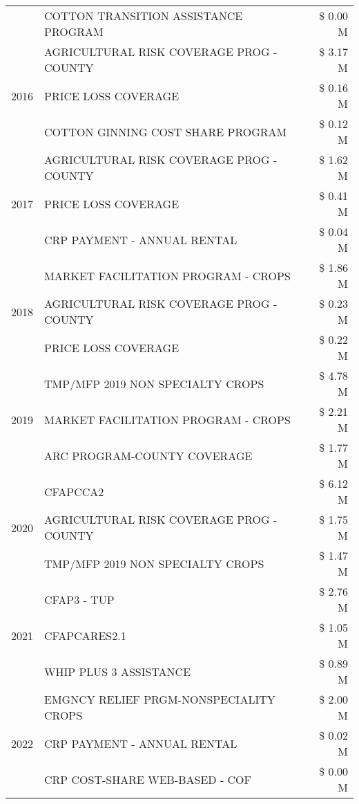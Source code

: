 \begin{tabular}{llr}
 & COTTON TRANSITION ASSISTANCE PROGRAM & \$ 0.00 M \\
\cline{1-3}
\multirow[t]{3}{*}{2016} & AGRICULTURAL RISK COVERAGE PROG - COUNTY & \$ 3.17 M \\
 & PRICE LOSS COVERAGE & \$ 0.16 M \\
 & COTTON GINNING COST SHARE PROGRAM & \$ 0.12 M \\
\cline{1-3}
\multirow[t]{3}{*}{2017} & AGRICULTURAL RISK COVERAGE PROG - COUNTY & \$ 1.62 M \\
 & PRICE LOSS COVERAGE & \$ 0.41 M \\
 & CRP PAYMENT - ANNUAL RENTAL & \$ 0.04 M \\
\cline{1-3}
\multirow[t]{3}{*}{2018} & MARKET FACILITATION PROGRAM - CROPS & \$ 1.86 M \\
 & AGRICULTURAL RISK COVERAGE PROG - COUNTY & \$ 0.23 M \\
 & PRICE LOSS COVERAGE & \$ 0.22 M \\
\cline{1-3}
\multirow[t]{3}{*}{2019} & TMP/MFP 2019 NON SPECIALTY CROPS & \$ 4.78 M \\
 & MARKET FACILITATION PROGRAM - CROPS & \$ 2.21 M \\
 & ARC PROGRAM-COUNTY COVERAGE & \$ 1.77 M \\
\cline{1-3}
\multirow[t]{3}{*}{2020} & CFAPCCA2 & \$ 6.12 M \\
 & AGRICULTURAL RISK COVERAGE PROG - COUNTY & \$ 1.75 M \\
 & TMP/MFP 2019 NON SPECIALTY CROPS & \$ 1.47 M \\
\cline{1-3}
\multirow[t]{3}{*}{2021} & CFAP3 - TUP & \$ 2.76 M \\
 & CFAPCARES2.1 & \$ 1.05 M \\
 & WHIP PLUS 3 ASSISTANCE & \$ 0.89 M \\
\cline{1-3}
\multirow[t]{3}{*}{2022} & EMGNCY RELIEF PRGM-NONSPECIALITY CROPS & \$ 2.00 M \\
 & CRP PAYMENT - ANNUAL RENTAL & \$ 0.02 M \\
 & CRP COST-SHARE WEB-BASED - COF & \$ 0.00 M \\
\cline{1-3}
\bottomrule
\end{tabular}
